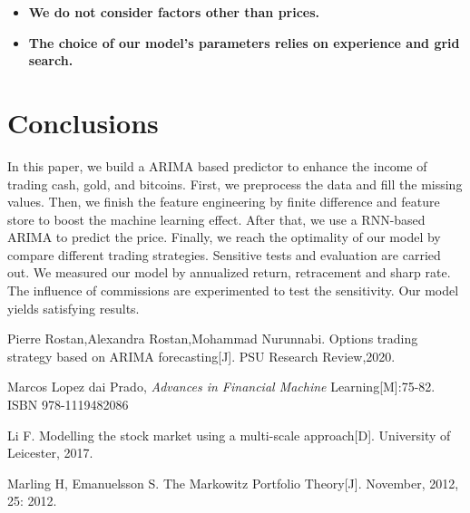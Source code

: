 \documentclass[12pt,a4paper]{article}
\newcommand{\Predictor}{ARIMA }
\begin{document}
\begin{spacing}{1.2}
\begin{itemize}
\item \textbf{We do not consider factors other than prices.}

\item \textbf{The choice of our model's parameters relies on experience and grid search.}
\end{itemize}


\section{Conclusions}
\label{Conclusions}

In this paper, we build a \Predictor based predictor to enhance the income of trading cash, gold, and bitcoins. First, we preprocess the data and fill the missing values. Then, we finish the feature engineering by finite difference and feature store to boost the machine learning effect. After that, we use a RNN-based \Predictor to predict the price. Finally, we reach the optimality of our model by compare different trading strategies. Sensitive tests and evaluation are carried out. We measured our model by annualized return, retracement and sharp rate. The influence of commissions are experimented to test the sensitivity. Our model yields satisfying results.




\newpage
\begin{thebibliography}{00}


Pierre Rostan,Alexandra Rostan,Mohammad Nurunnabi. Options trading strategy based on ARIMA forecasting[J]. PSU Research Review,2020.


Marcos Lopez dai Prado, \textit{Advances in Financial Machine} Learning[M]:75-82. ISBN 978-1119482086

Li F. Modelling the stock market using a multi-scale approach[D]. University of Leicester, 2017.

Marling H, Emanuelsson S. The Markowitz Portfolio Theory[J]. November, 2012, 25: 2012.


\end{thebibliography}


\addtocounter{page}{-1}
\thispagestyle{empty}

\newpage
\addtocounter{page}{-1}
\thispagestyle{empty}


\end{spacing}
\end{document}
